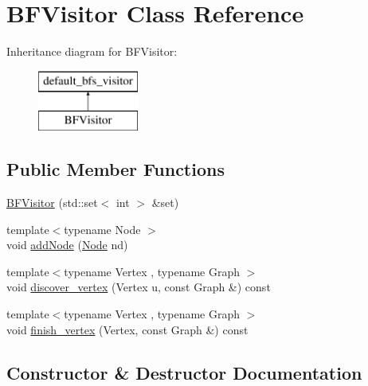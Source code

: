 \hypertarget{class_b_f_visitor}{}\section{B\+F\+Visitor Class Reference}
\label{class_b_f_visitor}
Inheritance diagram for B\+F\+Visitor\+:\begin{figure}[H]
\begin{center}
\leavevmode
\includegraphics[height=2.000000cm]{df/d5f/class_b_f_visitor}
\end{center}
\end{figure}
\subsection*{Public Member Functions}
\begin{DoxyCompactItemize}
\item 
\mbox{\hyperlink{class_b_f_visitor_a9840636d2e081d780b1dd23a039fa51b}{B\+F\+Visitor}} (std\+::set$<$ int $>$ \&set)
\item 
{\footnotesize template$<$typename Node $>$ }\\void \mbox{\hyperlink{class_b_f_visitor_acf3f5a29df895b4e903aa4100250a9f8}{add\+Node}} (\mbox{\hyperlink{class_node}{Node}} nd)
\item 
{\footnotesize template$<$typename Vertex , typename Graph $>$ }\\void \mbox{\hyperlink{class_b_f_visitor_a1ebe9cbc48241d4f36f8b973140b61a1}{discover\+\_\+vertex}} (Vertex u, const Graph \&) const
\item 
{\footnotesize template$<$typename Vertex , typename Graph $>$ }\\void \mbox{\hyperlink{class_b_f_visitor_a0e9ab5693fef13695063135ae9a5b6c5}{finish\+\_\+vertex}} (Vertex, const Graph \&) const
\end{DoxyCompactItemize}


\subsection{Constructor \& Destructor Documentation}
\mbox{\label{class_b_f_visitor_a9840636d2e081d780b1dd23a039fa51b}} 
